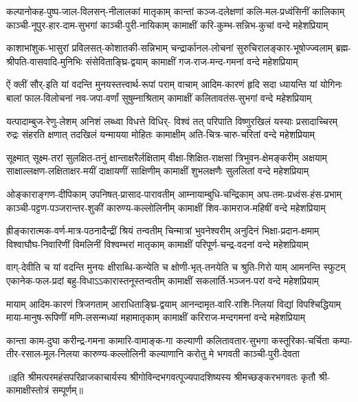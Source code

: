 
\setlength{\shlokaspaceskip}{16pt}
\fourlineindentedshloka
{कल्पानोकह-पुष्प-जाल-विलसन्-नीलालकां मातृकाम्}
{कान्तां कञ्ज-दलेक्षणां कलि-मल-प्रध्वंसिनीं कालिकाम्}
{काञ्ची-नूपुर-हार-दाम-सुभगां काञ्ची-पुरी-नायिकाम्}
{कामाक्षीं करि-कुम्भ-सन्निभ-कुचां वन्दे महेशप्रियाम्}%

\fourlineindentedshloka
{काशाभांशुक-भासुरां प्रविलसत्-कोशातकी-सन्निभाम्}
{चन्द्रार्कानल-लोचनां सुरुचिरालङ्कार-भूषोज्ज्वलाम्}
{ब्रह्म-श्रीपति-वासवादि-मुनिभिः संसेविताङ्घ्रि-द्वयाम्}
{कामाक्षीं गज-राज-मन्द-गमनां वन्दे महेशप्रियाम्}%

\fourlineindentedshloka
{ऐं क्लीं सौर्-इति यां वदन्ति मुनयस्तत्त्वार्थ-रूपां पराम्}
{वाचाम् आदिम-कारणं हृदि सदा ध्यायन्ति यां योगिनः}
{बालां फाल-विलोचनां नव-जपा-वर्णां सुषुम्नाश्रिताम्}
{कामाक्षीं कलितावतंस-सुभगां वन्दे महेशप्रियाम्}%

\fourlineindentedshloka
{यत्पादाम्बुज-रेणु-लेशम् अनिशं लब्ध्वा विधत्ते विधिर्-}
{विश्वं तत् परिपाति विष्णुरखिलं यस्याः प्रसादाच्चिरम्}
{रुद्रः संहरति क्षणात् तदखिलं यन्मायया मोहितः}
{कामाक्षीम् अति-चित्र-चारु-चरितां वन्दे महेशप्रियाम्}%

\fourlineindentedshloka
{सूक्ष्मात् सूक्ष्म-तरां सुलक्षित-तनुं क्षान्ताक्षरैर्लक्षिताम्}
{वीक्षा-शिक्षित-राक्षसां त्रिभुवन-क्षेमङ्करीम् अक्षयाम्}
{साक्षाल्लक्षण-लक्षिताक्षर-मयीं दाक्षायणीं साक्षिणीम्}
{कामाक्षीं शुभलक्षणैः सुललितां वन्दे महेशप्रियाम्}%

\fourlineindentedshloka
{ओङ्काराङ्गण-दीपिकाम् उपनिषत्-प्रासाद-पारावतीम्}
{आम्नायाम्बुधि-चन्द्रिकाम् अघ-तमः-प्रध्वंस-हंस-प्रभाम्}
{काञ्ची-पट्टण-पञ्जरान्तर-शुकीं कारुण्य-कल्लोलिनीम्}
{कामाक्षीं शिव-कामराज-महिषीं वन्दे महेशप्रियाम्}%

\fourlineindentedshloka
{ह्रीङ्कारात्मक-वर्ण-मात्र-पठनादैन्द्रीं श्रियं तन्वतीम्}
{चिन्मात्रां भुवनेश्वरीम् अनुदिनं भिक्षा-प्रदान-क्षमाम्}
{विश्वाघौघ-निवारिणीं विमलिनीं विश्वम्भरां मातृकाम्}
{कामाक्षीं परिपूर्ण-चन्द्र-वदनां वन्दे महेशप्रियाम्}%

\fourlineindentedshloka
{वाग्-देवीति च यां वदन्ति मुनयः क्षीराब्धि-कन्येति च}
{क्षोणी-भृत्-तनयेति च श्रुति-गिरो याम् आमनन्ति स्फुटम्}
{एकानेक-फल-प्रदां बहु-विधाऽऽकारास्तनूस्तन्वतीम्}
{कामाक्षीं सकलार्ति-भञ्जन-परां वन्दे महेशप्रियाम्}%

\fourlineindentedshloka
{मायाम् आदिम-कारणं त्रिजगताम् आराधिताङ्घ्रि-द्वयाम्}
{आनन्दामृत-वारि-राशि-निलयां विद्यां विपश्चिद्धियाम्}
{माया-मानुष-रूपिणीं मणि-लसन्मध्यां महामातृकाम्}
{कामाक्षीं करिराज-मन्दगमनां वन्दे महेशप्रियाम्}%

\fourlineindentedshloka
{कान्ता काम-दुघा करीन्द्र-गमना कामारि-वामाङ्क-गा}
{कल्याणी कलितावतार-सुभगा कस्तूरिका-चर्चिता}
{कम्पा-तीर-रसाल-मूल-निलया कारुण्य-कल्लोलिनी}
{कल्याणानि करोतु मे भगवती काञ्ची-पुरी-देवता}%

{॥इति श्रीमत्परमहंसपरिव्राजकाचार्यस्य श्रीगोविन्दभगवत्पूज्यपादशिष्यस्य 
श्रीमच्छङ्करभगवतः कृतौ श्री-कामाक्षीस्तोत्रं सम्पूर्णम्॥}
\setlength{\shlokaspaceskip}{24pt}
